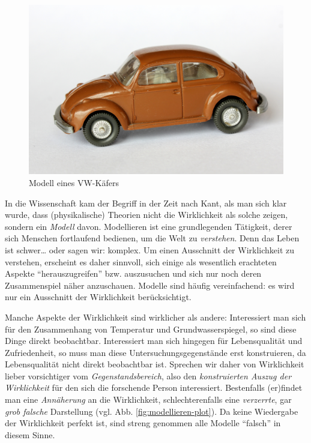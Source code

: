 \documentclass[12pt,ngerman,]{book}
\begin{document}
\begin{figure}

{\centering \includegraphics[width=0.7\linewidth]{images/modellieren/vw_modell} 

}

\caption{Modell eines VW-Käfers}\label{fig:vwmodell}
\end{figure}

In die Wissenschaft kam der Begriff in der Zeit nach Kant, als man sich
klar wurde, dass (physikalische) Theorien nicht die Wirklichkeit als
solche zeigen, sondern ein \emph{Modell} davon. Modellieren ist eine
grundlegenden Tätigkeit, derer sich Menschen fortlaufend bedienen, um
die Welt zu \emph{verstehen}. Denn das Leben ist schwer\ldots{} oder
sagen wir: komplex. Um einen Ausschnitt der Wirklichkeit zu verstehen,
erscheint es daher sinnvoll, sich einige als wesentlich erachteten
Aspekte ``herauszugreifen'' bzw. auszusuchen und sich nur noch deren
Zusammenspiel näher anzuschauen. Modelle sind häufig vereinfachend: es
wird nur ein Ausschnitt der Wirklichkeit berücksichtigt.

Manche Aspekte der Wirklichkeit sind wirklicher als andere: Interessiert
man sich für den Zusammenhang von Temperatur und Grundwasserspiegel, so
sind diese Dinge direkt beobachtbar. Interessiert man sich hingegen für
Lebensqualität und Zufriedenheit, so muss man diese
Untersuchungsgegenstände erst konstruieren, da Lebensqualität nicht
direkt beobachtbar ist. Sprechen wir daher von Wirklichkeit lieber
vorsichtiger vom \emph{Gegenstandsbereich}, also den \emph{konstruierten
Auszug der Wirklichkeit} für den sich die forschende Person
interessiert. Bestenfalls (er)findet man eine \emph{Annäherung} an die
Wirklichkeit, schlechterenfalls eine \emph{verzerrte}, gar \emph{grob
falsche} Darstellung (vgl. Abb. \ref{fig:modellieren-plot}). Da keine
Wiedergabe der Wirklichkeit perfekt ist, sind streng genommen alle
Modelle ``falsch'' in diesem Sinne.
\end{document}
